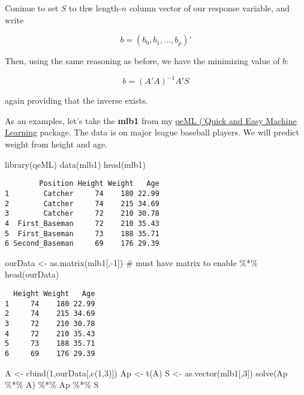 \documentclass[
  letterpaper,
  DIV=11,
  numbers=noendperiod,
  oneside]{scrreprt}
\newenvironment{Shaded}{\begin{snugshade}}{\end{snugshade}}
\newcommand{\CommentTok}[1]{\textcolor[rgb]{0.37,0.37,0.37}{#1}}
\newcommand{\DecValTok}[1]{\textcolor[rgb]{0.68,0.00,0.00}{#1}}
\newcommand{\FunctionTok}[1]{\textcolor[rgb]{0.28,0.35,0.67}{#1}}
\newcommand{\NormalTok}[1]{\textcolor[rgb]{0.00,0.23,0.31}{#1}}
\newcommand{\OtherTok}[1]{\textcolor[rgb]{0.00,0.23,0.31}{#1}}
\newcommand{\SpecialCharTok}[1]{\textcolor[rgb]{0.37,0.37,0.37}{#1}}
\begin{document}
Coninue to set \(S\) to thw length-\(n\) column vector of our response
variable, and write

\[
b = (b_0,b_1,...,b_p)'
\]

Then, using the same reasoning as before, we have the minimizing value
of \(b\):

\[
b = (A'A)^{-1} A'S
\]

again providing that the inverse exists.

As an examples, let's take the \textbf{mlb1} from my
\href{https://github.com/matloff/qeML}{qeML ('Quick and Easy Machine
Learning} package. {} The data is on major
league baseball players. We will predict weight from height and age.

\begin{Shaded}
\begin{Highlighting}[]
\FunctionTok{library}\NormalTok{(qeML)}
\FunctionTok{data}\NormalTok{(mlb1)}
\FunctionTok{head}\NormalTok{(mlb1)}
\end{Highlighting}
\end{Shaded}

\begin{verbatim}
        Position Height Weight   Age
1        Catcher     74    180 22.99
2        Catcher     74    215 34.69
3        Catcher     72    210 30.78
4  First_Baseman     72    210 35.43
5  First_Baseman     73    188 35.71
6 Second_Baseman     69    176 29.39
\end{verbatim}

\begin{Shaded}
\begin{Highlighting}[]
\NormalTok{ourData }\OtherTok{\textless{}{-}} \FunctionTok{as.matrix}\NormalTok{(mlb1[,}\SpecialCharTok{{-}}\DecValTok{1}\NormalTok{]) }\CommentTok{\# must have matrix to enable \%*\%}
\FunctionTok{head}\NormalTok{(ourData)}
\end{Highlighting}
\end{Shaded}

\begin{verbatim}
  Height Weight   Age
1     74    180 22.99
2     74    215 34.69
3     72    210 30.78
4     72    210 35.43
5     73    188 35.71
6     69    176 29.39
\end{verbatim}

\begin{Shaded}
\begin{Highlighting}[]
\NormalTok{A }\OtherTok{\textless{}{-}} \FunctionTok{cbind}\NormalTok{(}\DecValTok{1}\NormalTok{,ourData[,}\FunctionTok{c}\NormalTok{(}\DecValTok{1}\NormalTok{,}\DecValTok{3}\NormalTok{)])}
\NormalTok{Ap }\OtherTok{\textless{}{-}} \FunctionTok{t}\NormalTok{(A)}
\NormalTok{S }\OtherTok{\textless{}{-}} \FunctionTok{as.vector}\NormalTok{(mlb1[,}\DecValTok{3}\NormalTok{])}
\FunctionTok{solve}\NormalTok{(Ap }\SpecialCharTok{\%*\%}\NormalTok{ A) }\SpecialCharTok{\%*\%}\NormalTok{ Ap }\SpecialCharTok{\%*\%}\NormalTok{ S}
\end{Highlighting}
\end{Shaded}
\end{document}
